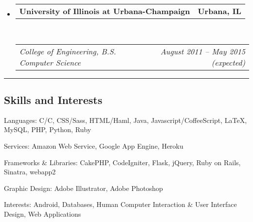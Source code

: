 \documentclass[10pt,letterpaper]{article}
\makeatletter
\newcommand{\headerrow}[2]
{\begin{tabular*}{\linewidth}{l@{\extracolsep{\fill}}r}
	#1 &
	#2 \\
\end{tabular*}}
\newcommand{\CPP}
{C\nolinebreak[4]\hspace{-.05em}\raisebox{.22ex}{\footnotesize\bf ++}}
\makeatother
\begin{document}
\begin{itemize}
	\parskip=0.1em

	\item 
	\headerrow
		{\textbf{University of Illinois at Urbana-Champaign}}
		{\textbf{Urbana, IL}}
	\\
	\headerrow
		{\emph{College of Engineering, B.S. Computer Science}}
		{\emph{August 2011 -- May 2015 (expected)}}
	\vspace{-1.5em}

\end{itemize}


\hrule
\vspace{-0.4em}
\subsection*{Skills and Interests}

\begin{description*}
	\item[Languages:]
       C/\CPP, CSS/Sass, HTML/Haml, Java, Javascript/CoffeeScript, \LaTeX, MySQL, PHP, Python, Ruby
	\item[Services:]
	Amazon Web Service, Google App Engine, Heroku
	\item[Frameworks \& Libraries:]
	CakePHP, CodeIgniter, Flask, jQuery, Ruby on Rails, Sinatra, webapp2
	\item[Graphic Design:]
	Adobe Illustrator, Adobe Photoshop
	\item[Interests:]
	Android, Databases, Human Computer Interaction \& User Interface Design, Web 
	Applications
\end{description*}
\end{document}
